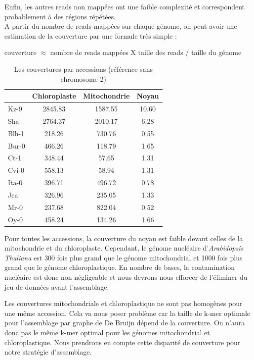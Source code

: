 \documentclass[a4paper]{article}
\begin{document}
Enfin, les autres reads non mappées ont une faible complexité et correspondent probablement à des régions répétées. \\

A partir du nombre de reads mappées sur chaque génome, on peut avoir une estimation de la couverture par une formule très simple : 

couverture $\approx$ nombre de reads mappées X taille des reads / taille du génome

\begin{table}[H]
\centering
\begin{tabular}{|l|ccc|}
  \hline
 & Chloroplaste & Mitochondrie & Noyau \\ 
  \hline
Kz-9 & 2845.83 & 1587.55 & 10.60 \\ 
  Sha & 2764.37 & 2010.17 & 6.28 \\ 
  Blh-1 & 218.26 & 730.76 & 0.55 \\ 
  Bur-0 & 466.26 & 118.79 & 1.65 \\ 
  Ct-1 & 348.44 & 57.65 & 1.31 \\ 
  Cvi-0 & 558.13 & 58.94 & 1.31 \\ 
  Ita-0 & 396.71 & 496.72 & 0.78 \\ 
  Jea & 326.96 & 235.05 & 1.33 \\ 
  Mr-0 & 237.68 & 822.04 & 0.52 \\ 
  Oy-0 & 458.24 & 134.26 & 1.66 \\ 
   \hline
\end{tabular}
\caption{Les couvertures par accessions (référence sans chromosome 2)}
\end{table}

Pour toutes les accessions, la couverture du noyau est faible devant celles de la mitochondrie et du chloroplaste. Cependant, le génome nucléaire d'\textit{Arabidopsis Thaliana} est 300 fois plus grand que le génome mitochondrial et 1000 fois plus grand que le génome chloroplastique. En nombre de bases, la contamination nucléaire est donc non négligeable et nous devrons nous efforcer de l'éliminer du jeu de données avant l'assemblage. 

Les couvertures mitochondriale et chloroplastique ne sont pas homogènes pour une même accession. Cela va nous poser problème car la taille de k-mer optimale pour l'assemblage par graphe de De Bruijn dépend de la couverture. On n'aura donc pas le même k-mer optimal pour les génomes mitochondrial et chloroplastique. Nous prendrons en compte cette disparité de couverture pour notre stratégie d'assemblage.
\end{document}
